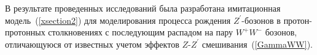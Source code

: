 В результате проведенных исследований была разработана
имитационная модель~(\ref{xsection2}) для моделирования процесса рождения ${Z}^{\prime}$-бозонов в протон-протонных столкновениях с последующим распадом на пару ${W}^{+}{W}^{-}$ бозонов, отличающуюся от известных учетом эффектов $Z$-${Z}^{\prime}$ смешивания~(\ref{GammaWW}).